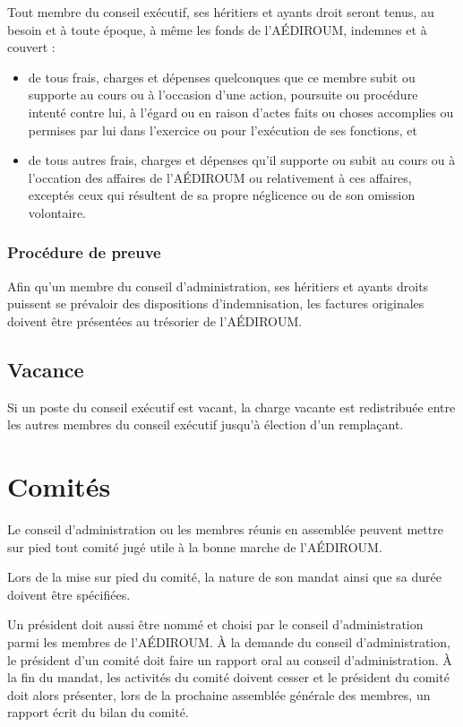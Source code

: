 \documentclass[12pt]{article}
\begin{document}
Tout membre du conseil exécutif, ses héritiers et ayants droit seront tenus, au besoin et à toute époque, à même les fonds de l'AÉDIROUM, indemnes et à couvert :
\begin{itemize}
\item de tous frais, charges et dépenses quelconques que ce membre subit ou supporte au cours ou à l'occasion d'une action, poursuite ou procédure intenté contre lui, à l'égard ou en raison d'actes faits ou choses accomplies ou permises par lui dans l'exercice ou pour l'exécution de ses fonctions, et
\item de tous autres frais, charges et dépenses qu'il supporte ou subit au cours ou à l'occation des affaires de l'AÉDIROUM ou relativement à ces affaires, exceptés ceux qui résultent de sa propre néglicence ou de son omission volontaire.
\end{itemize}

\subsubsection{Procédure de preuve}

Afin qu'un membre du conseil d'administration, ses héritiers et ayants droits puissent se prévaloir des dispositions d'indemnisation, les factures originales doivent être présentées au trésorier de l'AÉDIROUM.

\subsection{Vacance}

Si un poste du conseil exécutif est vacant, la charge vacante est redistribuée entre les autres membres du conseil exécutif jusqu'à élection d'un remplaçant.

\section{Comités}

Le conseil d'administration ou les membres réunis en assemblée peuvent mettre sur pied tout comité jugé utile à la bonne marche de l'AÉDIROUM.

Lors de la mise sur pied du comité, la nature de son mandat ainsi que sa durée doivent être spécifiées.

Un président doit aussi être nommé et choisi par le conseil d'administration parmi les membres de l'AÉDIROUM. À la demande du conseil d'administration, le président d'un comité doit faire un rapport oral au conseil d'administration. À la fin du mandat, les activités du comité doivent cesser et le président du comité doit alors présenter, lors de la prochaine assemblée générale des membres, un rapport écrit du bilan du comité.
\end{document}
